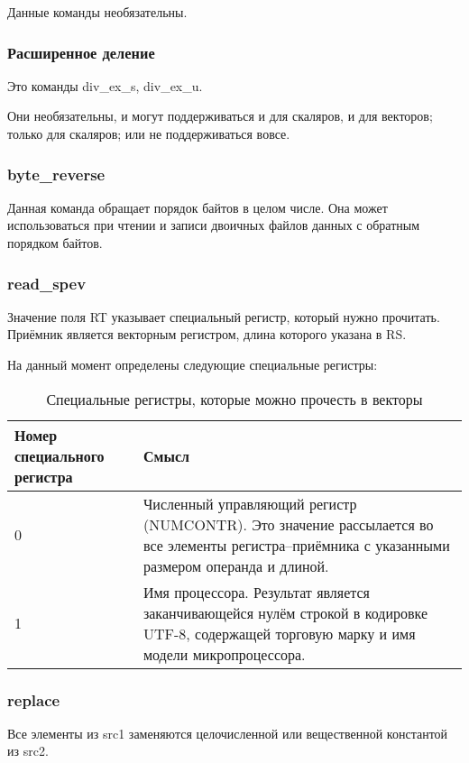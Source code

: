 \documentclass[forwardcom.tex]{subfiles}
\begin{document}
Данные команды необязательны.

\subsubsection{Расширенное деление} \label{extendedDivisionInstruction}
Это команды div\_ex\_s, div\_ex\_u.

Они необязательны, и могут поддерживаться и для скаляров, и для векторов; только для скаляров; или не поддерживаться вовсе.

\subsubsection{byte\_reverse}
Данная команда обращает порядок байтов в целом числе. Она может использоваться при чтении и записи двоичных файлов данных с обратным порядком байтов.

\subsubsection{read\_spev}
Значение поля RT указывает специальный регистр, который нужно прочитать. Приёмник является векторным регистром, длина которого указана в RS.

На данный момент определены следующие специальные регистры:

\begin{longtable} {|p{20mm}|p{130mm}|}
\caption{Специальные регистры, которые можно прочесть в векторы} 
\label{table:specialVectorRegisters} \\
\endfirsthead
\endhead
\hline
\bfseries Номер специального регистра & \bfseries Смысл  \\ \hline
0                                     & Численный управляющий регистр (NUMCONTR). Это значение рассылается во все элементы регистра--приёмника с указанными размером операнда и длиной.  \\ \hline
1                                     & Имя процессора. Результат является заканчивающейся нулём строкой в кодировке UTF-8, содержащей торговую марку и имя модели микропроцессора. \\ \hline
\end{longtable}

\subsubsection{replace}
Все элементы из src1 заменяются целочисленной или вещественной константой из src2.
\end{document}
